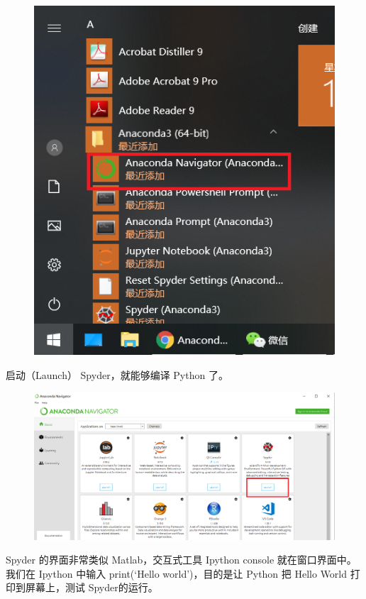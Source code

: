 \clearpage
\begin{figure}[!ht]
  \centering
  \includegraphics[scale=0.5]{figure/chapter1/anaconda11.png}
\end{figure}


启动（Launch） Spyder，就能够编译 Python 了。

\begin{figure}[!ht]
  \centering
  \includegraphics[scale=0.3]{figure/chapter1/anaconda4.png}
\end{figure}


Spyder 的界面非常类似 Matlab，交互式工具 Ipython console 就在窗口界面中。我们在 Ipython 中输入 print(`Hello world')，目的是让 Python 把 Hello World 打印到屏幕上，测试 Spyder的运行。

